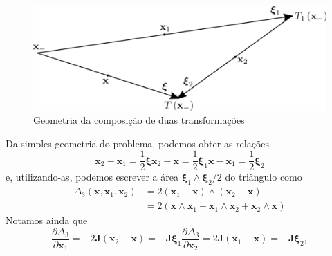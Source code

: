 \documentclass[
	12pt,
	oneside,			%
	a4paper,			%
	english,			%
	brazil				%
	]{abntex2}
\theoremstyle{definition}
\begin{document}
\begin{figure}[H]
    \includegraphics[width=.8\textwidth]{Imagens/triangles.png}
    \centering
    \caption{Geometria da composição de duas transformações}
    \label{composição_duas_transformações}
\end{figure}

Da simples geometria do problema, podemos obter as relações
\begin{subequations}
    \begin{equation}
        \mathbf{x}_2 - \mathbf{x}_1 = \frac{1}{2}\boldsymbol{\xi}
    \end{equation}
    \begin{equation}
        \mathbf{x}_2 - \mathbf{x} = \frac{1}{2}\boldsymbol{\xi}_1
    \end{equation}
    \begin{equation}
        \mathbf{x} - \mathbf{x}_1 = \frac{1}{2}\boldsymbol{\xi}_2
    \end{equation}
\end{subequations}
e, utilizando-as, podemos escrever a área $\boldsymbol{\xi}_1 \wedge \boldsymbol{\xi}_2/2$ do triângulo como 
\begin{equation}
    \begin{aligned}
        \Delta_3 (\mathbf{x},\mathbf{x}_1,\mathbf{x}_2) &= 2 \left( \mathbf{x}_1 - \mathbf{x} \right) \wedge \left( \mathbf{x}_2 - \mathbf{x} \right) \\
        &= 2 \left( \mathbf{x} \wedge \mathbf{x}_1 + \mathbf{x}_1 \wedge \mathbf{x}_2 + \mathbf{x}_2 \wedge \mathbf{x} \right)
    \end{aligned}
\end{equation}
Notamos ainda que
\begin{subequations}
    \begin{equation}
        \frac{\partial \Delta_3}{\partial \mathbf{x}_1} = - 2 \mathbf{J} \left( \mathbf{x}_2 - \mathbf{x} \right) = -\mathbf{J} \boldsymbol{\xi}_1 
    \end{equation}
    \begin{equation}
        \frac{\partial \Delta_3}{\partial \mathbf{x}_2} =  2 \mathbf{J} \left( \mathbf{x}_1 - \mathbf{x} \right) = -\mathbf{J} \boldsymbol{\xi}_2,
    \end{equation}
\end{subequations}
\end{document}
